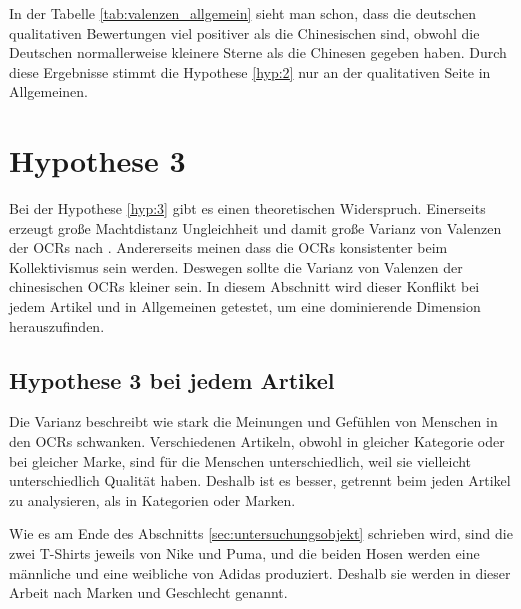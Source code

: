 In der Tabelle \ref{tab:valenzen_allgemein} sieht man schon, dass die deutschen qualitativen Bewertungen viel positiver als die Chinesischen sind, obwohl die Deutschen normallerweise kleinere Sterne als die Chinesen gegeben haben. Durch diese Ergebnisse stimmt die Hypothese \ref{hyp:2} nur an der qualitativen Seite in Allgemeinen. 

\section{Hypothese 3}
Bei der Hypothese \ref{hyp:3} gibt es einen theoretischen Widerspruch. Einerseits erzeugt große Machtdistanz Ungleichheit und damit große Varianz von Valenzen der \ac{OCRs} nach \citet{hofstede2013interkulturelle}. Andererseits meinen \citeauthor{Luo2014} dass die \ac{OCRs} konsistenter beim Kollektivismus sein werden. Deswegen sollte die Varianz von Valenzen der chinesischen \ac{OCRs} kleiner sein. In diesem Abschnitt wird dieser Konflikt bei jedem Artikel und in Allgemeinen getestet, um eine dominierende Dimension herauszufinden.
\subsection{Hypothese 3 bei jedem Artikel} \label{sec:h3_jeweils}
Die Varianz beschreibt wie stark die Meinungen und Gefühlen von Menschen in den \ac{OCRs} schwanken. Verschiedenen Artikeln, obwohl in gleicher Kategorie oder bei gleicher Marke, sind für die Menschen unterschiedlich, weil sie vielleicht unterschiedlich Qualität haben. Deshalb ist es besser, getrennt beim jeden Artikel zu analysieren, als in Kategorien oder Marken.

Wie es am Ende des Abschnitts \ref{sec:untersuchungsobjekt} schrieben wird, sind die zwei T-Shirts jeweils von Nike und Puma, und die beiden Hosen werden eine männliche und eine weibliche von Adidas produziert. Deshalb sie werden in dieser Arbeit nach Marken und Geschlecht genannt. 

